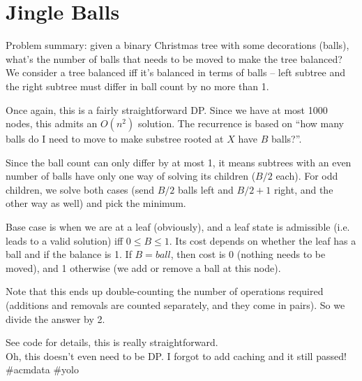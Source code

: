 \section{Jingle Balls}

Problem summary: given a binary Christmas tree with some decorations (balls),
what's the number of balls that needs to be moved to make the tree balanced? We
consider a tree balanced iff it's balanced in terms of balls -- left subtree and
the right subtree must differ in ball count by no more than 1.

Once again, this is a fairly straightforward DP. Since we have at most 1000
nodes, this admits an $O(n^2)$ solution. The recurrence is based on ``how many
balls do I need to move to make substree rooted at $X$ have $B$ balls?''.

Since the ball count can only differ by at most 1, it means subtrees with an
even number of balls have only one way of solving its children ($B/2$ each). For
odd children, we solve both cases (send $B/2$ balls left and $B/2+1$ right, and
the other way as well) and pick the minimum.

Base case is when we are at a leaf (obviously), and a leaf state is admissible
(i.e. leads to a valid solution) iff $0 \leq B \leq 1$. Its cost depends on
whether the leaf has a ball and if the balance is 1. If $B = ball$, then cost is
0 (nothing needs to be moved), and 1 otherwise (we add or remove a ball at this
node).

Note that this ends up double-counting the number of operations required
(additions and removals are counted separately, and they come in pairs). So we
divide the answer by 2.

See code for details, this is really straightforward.\\[5mm]

Oh, this doesn't even need to be DP. I forgot to add caching and it still
passed! \#acmdata \#yolo
